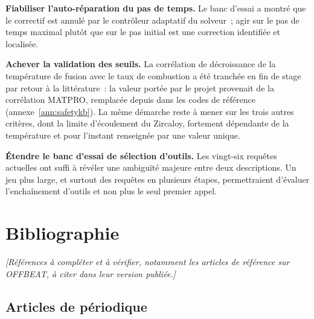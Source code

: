\documentclass[12pt,a4paper,french]{report}
\begin{document}
\textbf{Fiabiliser l'auto-réparation du pas de temps.} Le banc d'essai a montré
que le correctif est annulé par le contrôleur adaptatif du solveur~; agir sur le
pas de temps maximal plutôt que sur le pas initial est une correction
identifiée et localisée.

\textbf{Achever la validation des seuils.} La corrélation de décroissance de la
température de fusion avec le taux de combustion a été tranchée en fin de stage
par retour à la littérature~: la valeur portée par le projet provenait de la
corrélation MATPRO, remplacée depuis dans les codes de référence
(annexe~\ref{ann:safetykb}). La même démarche reste à mener sur les trois autres
critères, dont la limite d'écoulement du Zircaloy, fortement dépendante de la
température et pour l'instant renseignée par une valeur unique.

\textbf{Étendre le banc d'essai de sélection d'outils.} Les vingt-six requêtes
actuelles ont suffi à révéler une ambiguïté majeure entre deux descriptions.
Un jeu plus large, et surtout des requêtes en plusieurs étapes, permettraient
d'évaluer l'enchaînement d'outils et non plus le seul premier appel.

\clearpage

\chapter*{Bibliographie}

\vspace{0.3cm}
\noindent\textit{\color{red}[Références à compléter et à vérifier, notamment
les articles de référence sur OFFBEAT, à citer dans leur version publiée.]}
\vspace{0.6cm}

\section*{Articles de périodique}
\end{document}
